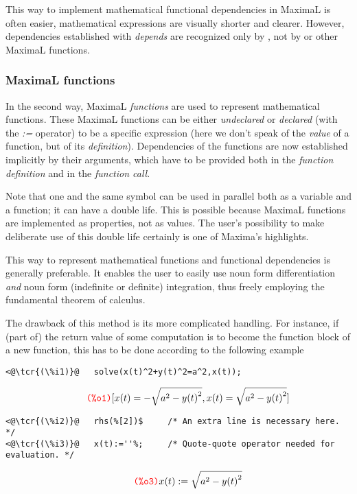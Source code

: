 \documentclass[../Maxima_Workbook.tex]{subfiles}
\begin{document}
\lz This way to implement mathematical functional dependencies in MaximaL is often easier, mathematical expressions are visually shorter and clearer. However, dependencies established with \emph{depends} are recognized only by , not by  or other MaximaL functions. 

\subsubsection{MaximaL functions}

In the second way, MaximaL \emph{functions} are used to represent mathematical functions. These MaximaL functions can be either \emph{undeclared} or \emph{declared} (with the \emph{:=} operator) to be a specific expression (here we don't speak of the \emph{value} of a function, but of its \emph{definition}). Dependencies of the functions are now established implicitly by their arguments, which have to be provided both in the \emph{function definition} and in the \emph{function call}. 

\lz Note that one and the same symbol can be used in parallel both as a variable and a function; it can have a double life. This is possible because MaximaL functions are implemented as properties, not as values. The user's possibility to make deliberate use of this double life certainly is one of Maxima's highlights.

\lz This way to represent mathematical functions and functional dependencies is generally preferable. It enables the user to easily use noun form differentiation \emph{and} noun form (indefinite or definite) integration, thus freely employing the fundamental theorem of calculus. 

\lz The drawback of this method is its more complicated handling. For instance, if (part of) the return value of some computation is to become the function block of a new function, this has to be done according to the following example

\lz \begin{small}
\color{blue} \leqn
\begin{lstlisting}
<@\tcr{(\%i1)}@   solve(x(t)^2+y(t)^2=a^2,x(t));
\end{lstlisting}
\vspace{-4mm} \[\tag*{\tcr{\ttfamily (\%o1)}} [x(t)=-\sqrt{{{a}^{2}}-{{y(t)}^{2}}},x(t)=\sqrt{{{a}^{2}}-{{y(t)}^{2}}}] \]
\vspace{-5mm} \begin{lstlisting}
<@\tcr{(\%i2)}@   rhs(%[2])$     /* An extra line is necessary here. */
<@\tcr{(\%i3)}@   x(t):=''%;     /* Quote-quote operator needed for evaluation. */
\end{lstlisting}
\vspace{-4mm} \[\tag*{\tcr{\ttfamily (\%o3)}} x(t):=\sqrt{{{a}^{2}}-{y(t)}^{2}} \]
\color{black} \reqn
\end{small} \vspace{-4mm}
\end{document}
